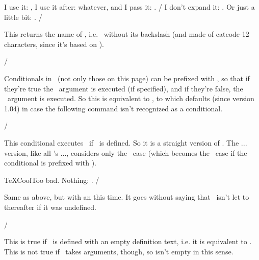 \Example
\def\bar{whatever} \def\foo#1{[#1]}
I use it: , 
I use it after: \bar,
and I pass it: \passcs\foo{bar}.
\Example/
\Example
\def\foo{\bar}
I don't expand it:
\edef\foobar{}%
\meaning\foobar.
Or just a little bit:
\edef\foobar{}%
\meaning\foobar.
\Example/

\cslist{
  !\commandtoname\comarg
  }
This returns the name of \comarg, i.e. \comarg\ without its backslash
(and made of catcode-12 characters, since it's based on \com\string).

\description/










\cslist{
  !\reverse
  }
Conditionals in \texapi\ (not only those on this page) can be prefixed with
\com\reverse, so that if they're true the \false\ argument is executed (if
specified), and if they're false, the \true\ argument is executed. So this is
equivalent to \com\unless, to which \com\reverse defaults (since version
1.04) in case the following command isn't recognized as a \texapi conditional.

\Example
\reverse\iffalse
  Wow, \verb"\reverse" can replace \verb"\unless"!
  We must be using version 1.04 at least!
\fi
\Example/

\cslist{
  !\ifcommand\comarg\true\false,
  !\iffcommand\comarg\true
  }
This conditional executes \true\ if \comarg\ is defined.
So it is a straight version of \com\ifdefined. The \com\iff...
version, like all \texapi's \com\iff..., considers only the
\true\ case (which becomes the \false\ case if the conditional
is prefixed with \com\reverse).

\Example
\ifcommand\TeX{Cool}{Too bad}.
Nothing: \iffcommand{}.
\Example/

\cslist{
  !\ifcs\csarg\true\false,
  !\iffcs\csarg\true
  }
Same as above, but with an \com\ifcsname this time.
It goes without saying that \csarg\ isn't let to \com\relax
thereafter if it was undefined.

\Example
\reverse{}
\Example/

\cslist{
  !\ifemptycommand\comarg\true\false,
  !\iffemptycommand\comarg\true
  }
This is true if \comarg\ is defined with an empty
definition text, i.e. it is equivalent to \com\emptycs.
This is not true if \comarg\ takes arguments, though,
so \com\gobbleone isn't empty in this sense.

